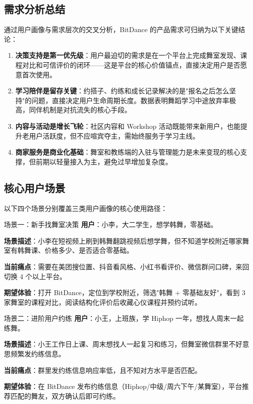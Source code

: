 \documentclass[12pt,a4paper]{ctexart}
\begin{document}
\subsection{需求分析总结}

通过用户画像与需求层次的交叉分析，BitDance 的产品需求可归纳为以下关键结论：

\begin{enumerate}
    \item \textbf{决策支持是第一优先级}：用户最迫切的需求是在一个平台上完成舞室发现、课程对比和可信评价的闭环——这是平台的核心价值锚点，直接决定用户是否愿意首次使用。
    \item \textbf{学习陪伴是留存关键}：约搭子、约练和成长记录解决的是"报名之后怎么坚持"的问题，直接决定用户生命周期长度。数据表明舞蹈学习中途放弃率极高，同伴机制是对抗流失的核心手段。
    \item \textbf{内容与活动是增长飞轮}：社区内容和 Workshop 活动既能带来新用户，也能提升老用户活跃度，但不应喧宾夺主，需始终服务于学习主线。
    \item \textbf{商家服务是商业化基础}：舞室和教练端的入驻与管理能力是未来变现的核心支撑，但前期以轻量接入为主，避免过早增加复杂度。
\end{enumerate}

\subsection{核心用户场景}

以下四个场景分别覆盖三类用户画像的核心使用路径：

\begin{scenariobox}{场景一：新手找舞室决策}
\textbf{用户}：小李，大二学生，想学韩舞，零基础。

\textbf{场景描述}：小李在短视频上刷到韩舞翻跳视频后想学舞，但不知道学校附近哪家舞室有韩舞课、价格多少、是否适合零基础。

\textbf{当前痛点}：需要在美团搜位置、抖音看风格、小红书看评价、微信群问口碑，来回切换 4 个以上平台。

\textbf{期望体验}：打开 BitDance，定位到学校附近，筛选"韩舞 + 零基础友好"，看到 3 家舞室的课程对比，阅读结构化评价后收藏心仪课程并预约试听。
\end{scenariobox}

\begin{scenariobox}{场景二：进阶用户约练}
\textbf{用户}：小王，上班族，学 Hiphop 一年，想找人周末一起练舞。

\textbf{场景描述}：小王工作日上课、周末想找人一起复习和练习，但舞室微信群里不好意思频繁发约练信息。

\textbf{当前痛点}：群里发约练信息响应率低，且不知对方水平是否匹配。

\textbf{期望体验}：在 BitDance 发布约练信息（Hiphop/中级/周六下午/某舞室），平台推荐匹配的舞友，双方确认后即可约练。
\end{scenariobox}
\end{document}
